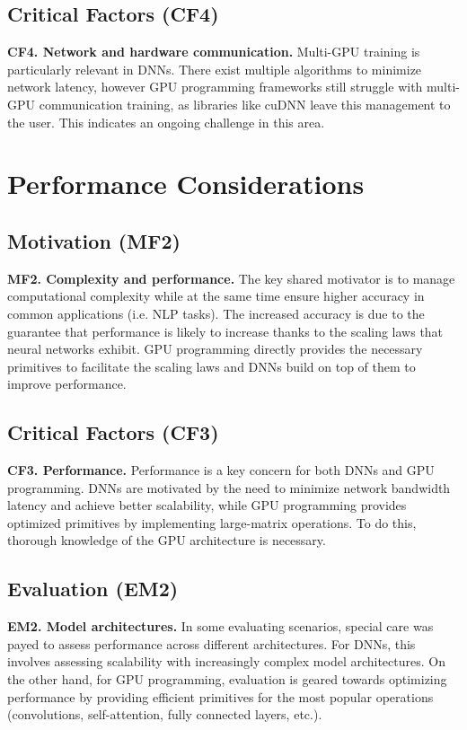 \subsection*{Critical Factors (CF4)}
\textbf{CF4. Network and hardware communication.} Multi-GPU training is particularly relevant in DNNs. There exist multiple algorithms to minimize
network latency, however GPU programming frameworks still struggle with multi-GPU communication
training, as libraries like cuDNN leave this management to the user. This indicates an ongoing
challenge in this area.

\section{Performance Considerations}
\subsection*{Motivation (MF2)}
\textbf{MF2. Complexity and performance.} The key shared motivator is to manage computational complexity while at the same time ensure higher accuracy
in common applications (i.e. NLP tasks). The increased accuracy is due to the guarantee that performance
is likely to increase thanks to the scaling laws that neural networks exhibit.
GPU programming directly provides the necessary primitives to facilitate the scaling laws and DNNs build on
top of them to improve performance.

\subsection*{Critical Factors (CF3)}
\textbf{CF3. Performance.} Performance is a key concern for both DNNs and GPU programming. DNNs are motivated by the need to
minimize network bandwidth latency and achieve better scalability, while GPU programming provides
optimized primitives by implementing large-matrix operations. To do this, thorough
knowledge of the GPU architecture is necessary.

\subsection*{Evaluation (EM2)}
\textbf{EM2. Model architectures.} In some evaluating scenarios, special care was payed to assess performance across different architectures.
For DNNs, this involves assessing scalability with increasingly complex model architectures. On the other hand,
for GPU programming, evaluation is geared towards optimizing performance by providing efficient primitives
for the most popular operations (convolutions, self-attention, fully connected layers, etc.).

